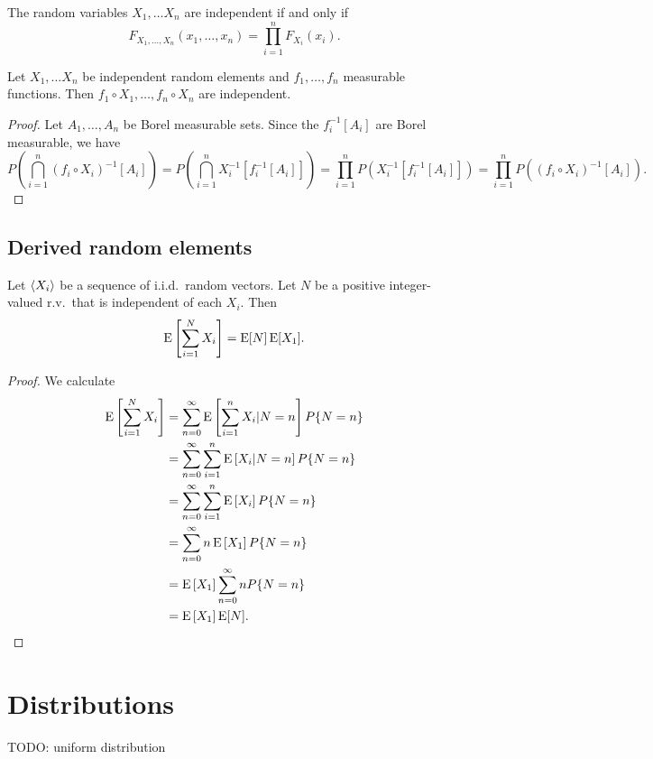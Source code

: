 \begin{proposition}
The random variables $X_1, \ldots X_n$ are independent \textup{if and only if}
\[ F_{X_1,\ldots, X_n}(x_1, \ldots, x_n) = \prod_{i=1}^n F_{X_i}(x_i). \]
\end{proposition}

\begin{proposition}
Let $X_1, \ldots X_n$ be independent random elements and $f_1, \ldots, f_n$ measurable functions. Then $f_1\circ X_1, \ldots, f_n\circ X_n$ are independent.
\end{proposition}
\begin{proof}
Let $A_1, \ldots, A_n$ be Borel measurable sets. Since the $f_i^{-1}[A_i]$ are Borel measurable, we have
\[ P\left(\bigcap_{i=1}^n (f_i\circ X_i)^{-1}[A_i]\right) = P\left(\bigcap_{i=1}^n X_i^{-1}[f^{-1}_i[A_i]]\right) = \prod_{i=1}^n P(X_i^{-1}[f^{-1}_i[A_i]]) = \prod_{i=1}^n P((f_i\circ X_i)^{-1}[A_i]). \]
\end{proof}

\section{Derived random elements}

\begin{proposition}
Let $\left\langle X_i \right\rangle$ be a sequence of i.i.d.\ random vectors. Let $N$ be a positive integer-valued r.v.\ that is independent of each $X_i$. Then
\[ \operatorname{E}\left[\sum_{i = 1}^N X_i\right] = \operatorname{E}[N]\operatorname{E}[X_1]. \]
\end{proposition}
\begin{proof}
We calculate
\begin{align*}
\operatorname{E}\left[\sum_{i = 1}^N X_i\right] &= \sum_{n=0}^{\infty}\operatorname{E}\left[\sum_{i = 1}^n X_i | N = n\right]P\{N = n\} \\
&= \sum_{n=0}^{\infty}\sum_{i = 1}^n \operatorname{E}\left[X_i | N = n\right]P\{N = n\} \\
&= \sum_{n=0}^{\infty}\sum_{i = 1}^n \operatorname{E}\left[X_i\right]P\{N = n\} \\
&= \sum_{n=0}^{\infty} n\operatorname{E}\left[X_1\right]P\{N = n\} \\
&= \operatorname{E}\left[X_1\right]\sum_{n=0}^{\infty} nP\{N = n\} \\
&= \operatorname{E}\left[X_1\right]\operatorname{E}[N].
\end{align*}
\end{proof}

\chapter{Distributions}
TODO: uniform distribution

